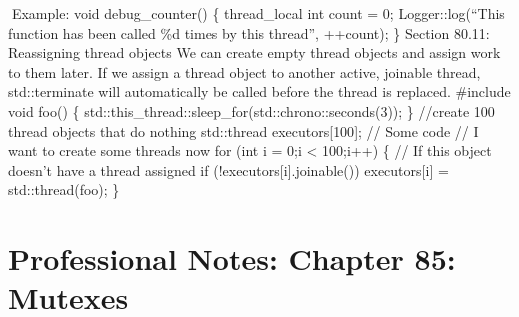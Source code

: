Example: void debug\_counter() \{ thread\_local int count = 0;
Logger::log(``This function has been called \%d times by this thread'',
++count); \} Section 80.11: Reassigning thread objects We can create
empty thread objects and assign work to them later. If we assign a
thread object to another active, joinable thread, std::terminate will
automatically be called before the thread is replaced. \#include void
foo() \{ std::this\_thread::sleep\_for(std::chrono::seconds(3)); \}
//create 100 thread objects that do nothing std::thread
executors{[}100{]}; // Some code // I want to create some threads now
for (int i = 0;i \textless{} 100;i++) \{ // If this object doesn't have
a thread assigned if (!executors{[}i{]}.joinable()) executors{[}i{]} =
std::thread(foo); \}

\hypertarget{professional-notes-chapter-85-mutexes-1}{%
\section{Professional Notes: Chapter 85:
Mutexes}\label{professional-notes-chapter-85-mutexes-1}}

